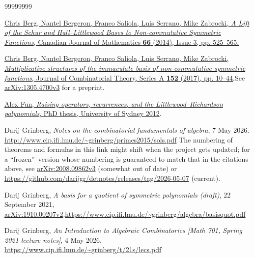 \documentclass[numbers=enddot,12pt,final,onecolumn,notitlepage,english]{scrartcl}%
\theoremstyle{definition}
\begin{document}
\begin{thebibliography}{99999999}                                                                                         %


\href{https://doi.org/10.4153/CJM-2013-013-0}{Chris
Berg, Nantel Bergeron, Franco Saliola, Luis Serrano, Mike Zabrocki, \textit{A
Lift of the Schur and Hall--Littlewood Bases to Non-commutative Symmetric
Functions}, Canadian Journal of Mathematics \textbf{66} (2014), Issue 3, pp.
525--565.}

%
\href{https://doi.org/10.1016/j.jcta.2017.05.003}{Chris Berg, Nantel
Bergeron, Franco Saliola, Luis Serrano, Mike Zabrocki, \textit{Multiplicative
structures of the immaculate basis of non-commutative symmetric functions},
Journal of Combinatorial Theory, Series A \textbf{152} (2017), pp.
10--44}.\newline See
\href{https://arxiv.org/abs/1305.4700v3}{arXiv:1305.4700v3} for a preprint.

\href{http://hdl.handle.net/2123/8958}{Alex Fun,
\textit{Raising operators, recurrences, and the Littlewood--Richardson
polynomials}, PhD thesis, University of Sydney 2012}.

Darij Grinberg, \textit{Notes on the combinatorial
fundamentals of algebra}, 7 May 2026.\newline%
\url{http://www.cip.ifi.lmu.de/~grinberg/primes2015/sols.pdf} \newline The
numbering of theorems and formulas in this link might shift when the project
gets updated; for a \textquotedblleft frozen\textquotedblright\ version whose
numbering is guaranteed to match that in the citations above, see
\href{http://arxiv.org/abs/2008.09862v3}{arXiv:2008.09862v3} (somewhat
out of date) or
\url{https://github.com/darijgr/detnotes/releases/tag/2026-05-07} (current).

Darij Grinberg, \textit{A basis for a quotient of
symmetric polynomials (draft)}, 22 September 2021,
\href{https://arxiv.org/abs/1910.00207v2}{arXiv:1910.00207v2}.\newline\url{https://www.cip.ifi.lmu.de/~grinberg/algebra/basisquot.pdf}

Darij Grinberg, \textit{An Introduction to Algebraic
Combinatorics [Math 701, Spring 2021 lecture notes]}, 4 May 2026.\newline
\url{https://www.cip.ifi.lmu.de/~grinberg/t/21s/lecs.pdf}


\end{thebibliography}
\end{document}
